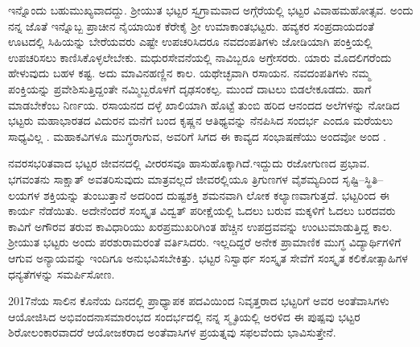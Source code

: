ಇನ್ನೊಂದು ಬಹುಮುಖ್ಯವಾದದ್ದು. ಶ್ರೀಯುತ ಭಟ್ಟರ ಸ್ವಗ್ರಾಮವಾದ ಅಗ್ಗೆರೆಯಲ್ಲಿ ಭಟ್ಟರ ವಿವಾಹಮಹೋತ್ಸವ. ಅಂದು ನನ್ನ ಜೊತೆ ಇನ್ನೊಬ್ಬ ಪ್ರಾಚೀನ ನೈಯಾಯಿಕ ಕೆರೇಕೈ ಶ್ರೀ ಉಮಾಕಾಂತಭಟ್ಟರು. ಹವ್ಯಕರ ಸಂಪ್ರದಾಯದಂತೆ ಊಟದಲ್ಲಿ ಸಿಹಿಯನ್ನು ಬೇರೆಯವರು ಎಷ್ಟೇ ಉಪಚರಿಸಿದರೂ ನವದಂಪತಿಗಳು ಜೋಡಿಯಾಗಿ ಪಂಕ್ತಿಯಲ್ಲಿ ಉಪಚರಿಸಲು ಕಾಣಿಸಿಕೊಳ್ಳಲೇಬೇಕು. ಮಧುರಸೇವನೆಯಲ್ಲಿ ನಾವಿಬ್ಬರೂ ಅಗ್ರೇಸರರು. ಯಾರು ಮೊದಲಿಗರೆಂದು ಹೇಳುವುದು ಬಹಳ ಕಷ್ಟ. ಅದು ಮಾವಿನಹಣ್ಣಿನ ಕಾಲ. ಯಥೇಚ್ಛವಾಗಿ ರಸಾಯನ. ನವದಂಪತಿಗಳು ನಮ್ಮ ಪಂಕ್ತಿಯನ್ನು ಪ್ರವೇಶಿಸುತ್ತಿದ್ದಂತೇ ನಮ್ಮಿಬ್ಬರೊಳಗೆ ದೃಢಸಂಕಲ್ಪ. ಮುಂದೆ ದಾಟಲು ಬಿಡಲೇಕೂಡದು. ಹಾಗೆ ಮಾಡಬೇಕೆಂಬ ನಿರ್ಣಯ. ರಸಾಯನದ ದಳ್ಳೆ ಖಾಲಿಯಾಗಿ ಹೊಟ್ಟೆ ತುಂಬಿ ಹರಿದ ಆನಂದದ ಅಲೆಗಳನ್ನು ನೋಡಿದ ಭಟ್ಟರು ಮಹಾಭಾರತದ ವಿದುರನ ಮನೆಗೆ ಬಂದ ಕೃಷ್ಣನ ಆತಿಥ್ಯವನ್ನು ನೆನಪಿಸಿದ ಸಂದರ್ಭ ಎಂದೂ ಮರೆಯಲು ಸಾಧ್ಯವಿಲ್ಲ . ಮಹಾಕವಿಗಳೂ ಮುಗ್ಧರಾಗುವ, ಅವರಿಗೆ ಸಿಗದ ಈ ಕಾವ್ಯದ ಸಂಭಾಷಣೆಯು ಅಂದವೋ ಅಂದ .

ನವರಸಭರಿತವಾದ ಭಟ್ಟರ ಜೀವನದಲ್ಲಿ ವೀರರಸವೂ ಹಾಸುಹೊಕ್ಕಾಗಿದೆ.ಇದ್ದುದು ರಜೋಗುಣದ ಪ್ರಭಾವ. ಭಗವಂತನು ಸಾಕ್ಷಾತ್ ಅವತರಿಸುವುದು ಮಾತ್ರವಲ್ಲದೆ ಜೀವರಲ್ಲಿಯೂ ತ್ರಿಗುಣಗಳ ವೈಶಮ್ಯದಿಂದ ಸೃಷ್ಟಿ–ಸ್ಥಿತಿ–ಲಯಗಳ ಶಕ್ತಿಯನ್ನು ತುಂಬುತ್ತಾನೆ ಅದರಿಂದ ದುಷ್ಟಶಕ್ತಿ ಶಮನವಾಗಿ \break ಲೋಕ ಕಲ್ಯಾಣವಾಗುತ್ತದೆ. ಭಟ್ಟರಿಂದ ಈ ಕಾರ್ಯ ನೆಡೆಯಿತು. ಅದೇನೆಂದರೆ ಸಂಸ್ಕೃತ ವಿದ್ವತ್ ಪರೀಕ್ಷೆಯಲ್ಲಿ ಓದಲು ಬರುವ ಮಕ್ಕಳಿಗೆ ಓದಲು ಬರದವರು ಕಾವಿಗೆ ಅಗೌರವ ತರುವ ಕಾವಿಧಾರಿಯು ಖರಪ್ರಮುಖರಿಗಿಂತ ಹೆಚ್ಚಿನ ಉಪದ್ರವವನ್ನು ಉಂಟುಮಾಡುತ್ತಿದ್ದ ಕಾಲ. ಶ್ರೀಯುತ ಭಟ್ಟರು ಅಂದು ಪರಶುರಾಮರಂತೆ ವರ್ತಿಸಿದರು. ಇಲ್ಲದಿದ್ದರೆ ಅನೇಕ ಪ್ರಾಮಾಣಿಕ ಮುಗ್ಧ ವಿದ್ಯಾರ್ಥಿಗಳಿಗೆ ಆಗುವ ಅನ್ಯಾಯವನ್ನು ಇಂದಿಗೂ ಅನುಭವಿಸಬೇಕಿತ್ತು. ಭಟ್ಟರ ನಿಸ್ವಾರ್ಥ ಸಂಸ್ಕೃತ ಸೇವೆಗೆ ಸಂಸ್ಕೃತ ಕಲಿಕೋತ್ಸಾಹಿಗಳ ಧನ್ಯತೆಗಳನ್ನು ಸಮರ್ಪಿಸೋಣ.

\newpage
2017ನೆಯ ಸಾಲಿನ ಕೊನೆಯ ದಿನದಲ್ಲಿ ಪ್ರಾಧ್ಯಾಪಕ ಪದವಿಯಿಂದ ನಿವೃತ್ತರಾದ ಭಟ್ಟರಿಗೆ ಅವರ ಅಂತೆವಾಸಿಗಳು ಆಯೋಜಿಸಿದ ಅಭಿವಂದನಾಸಮಾರಂಭದ ಸಂದರ್ಭದಲ್ಲಿ ನನ್ನ ಸ್ಮೃತಿಯಲ್ಲಿ ಅರಳಿದ ಈ ಪುಷ್ಪವು ಭಟ್ಟರ ಶಿರೋಲಂಕಾರವಾದರೆ  ಆಯೋಜಕರಾದ ಅಂತೆವಾಸಿಗಳ ಪ್ರಯತ್ನವು ಸಫಲವೆಂದು ಭಾವಿಸುತ್ತೇನೆ.

\articleend
